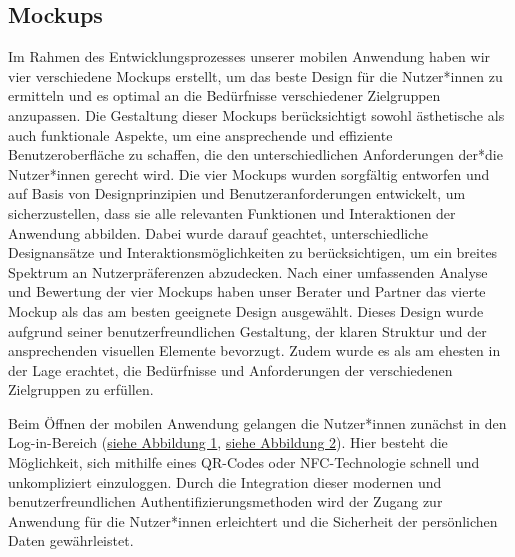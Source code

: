 \subsection{Mockups}
Im Rahmen des Entwicklungsprozesses unserer mobilen Anwendung haben wir vier verschiedene Mockups erstellt, um das beste Design für die Nutzer*innen zu ermitteln und es optimal an die Bedürfnisse verschiedener Zielgruppen anzupassen. Die Gestaltung dieser Mockups berücksichtigt sowohl ästhetische als auch funktionale Aspekte, um eine ansprechende und effiziente Benutzeroberfläche zu schaffen, die den unterschiedlichen Anforderungen der*die Nutzer*innen gerecht wird.
\newline
\newline
Die vier Mockups wurden sorgfältig entworfen und auf Basis von Designprinzipien und Benutzeranforderungen entwickelt, um sicherzustellen, dass sie alle relevanten Funktionen und Interaktionen der Anwendung abbilden. Dabei wurde darauf geachtet, unterschiedliche Designansätze und Interaktionsmöglichkeiten zu berücksichtigen, um ein breites Spektrum an Nutzerpräferenzen abzudecken.
\newline
\newline
Nach einer umfassenden Analyse und Bewertung der vier Mockups haben unser Berater und Partner das vierte Mockup als das am besten geeignete Design ausgewählt. Dieses Design wurde aufgrund seiner benutzerfreundlichen Gestaltung, der klaren Struktur und der ansprechenden visuellen Elemente bevorzugt. Zudem wurde es als am ehesten in der Lage erachtet, die Bedürfnisse und Anforderungen der verschiedenen Zielgruppen zu erfüllen.

\newpage
Beim Öffnen der mobilen Anwendung gelangen die Nutzer*innen zunächst in den Log-in-Bereich (\hyperref[fig:log1]{siehe Abbildung 1}, \hyperref[fig:log2]{siehe Abbildung 2}). Hier besteht die Möglichkeit, sich mithilfe eines QR-Codes oder NFC-Technologie schnell und unkompliziert einzuloggen. Durch die Integration dieser modernen und benutzerfreundlichen Authentifizierungsmethoden wird der Zugang zur Anwendung für die Nutzer*innen erleichtert und die Sicherheit der persönlichen Daten gewährleistet.


